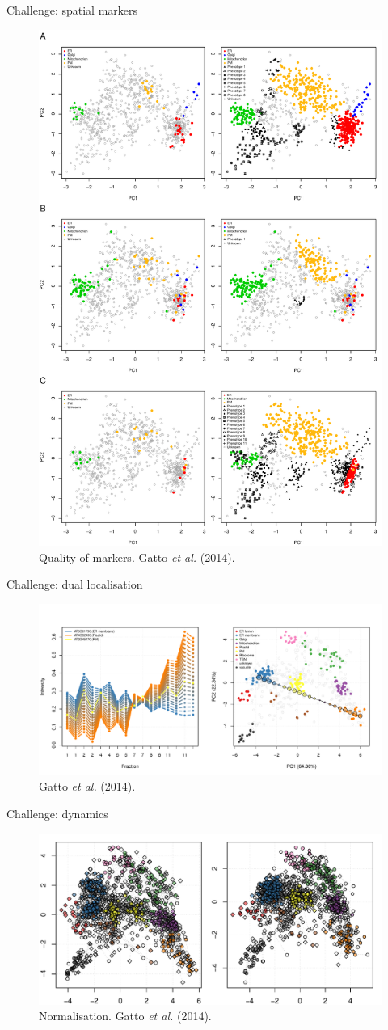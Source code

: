 \documentclass[presentation]{beamer}
\begin{document}
\begin{frame}{Challenge: spatial markers}
  \begin{figure}[h]
    \centering
    \includegraphics[width=.45\linewidth]{./figures/Fig6-pd.pdf}
    \caption{Quality of markers. Gatto \textit{et al.} (2014). }
  \end{figure}
\end{frame}


\begin{frame}{Challenge: dual localisation}
  \begin{figure}[h]
    \centering
    \includegraphics[width=.9\linewidth]{./figures/Fig-multiloc.pdf}
    \caption{Gatto \textit{et al.} (2014). }
  \end{figure}
\end{frame}

\begin{frame}{Challenge: dynamics}
  \begin{figure}[h]
    \centering
    \includegraphics[width=.9\linewidth]{./figures/transloc-normalisation.pdf}
    \caption{Normalisation. Gatto \textit{et al.} (2014). }
  \end{figure}
\end{frame}
\end{document}
